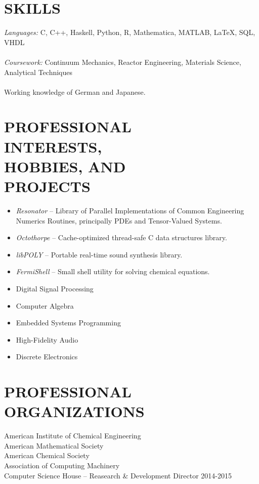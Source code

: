 \documentclass[line,margin]{res}
\begin{document}
\begin{resume}
\section{SKILLS} {\sl Languages:} C, C++, Haskell, Python, R, Mathematica, MATLAB, \LaTeX, SQL, VHDL \\ \\
                 {\sl Coursework:} Continuum Mechanics, Reactor Engineering, Materials Science, Analytical Techniques \\ \\
                 Working knowledge of German and Japanese.

\section{PROFESSIONAL \\ INTERESTS, \\ HOBBIES, AND \\ PROJECTS}
				\begin{itemize} \itemsep -2pt
				\item	\emph{Resonator} -- Library of Parallel Implementations of Common Engineering Numerics Routines, principally PDEs and Tensor-Valued Systems.
				\item	\emph{Octothorpe} -- Cache-optimized thread-safe C data structures library.
				\item	\emph{libPOLY} -- Portable real-time sound synthesis library.
				\item	\emph{FermiShell} -- Small shell utility for solving chemical equations.
				\item	Digital Signal Processing
				\item	Computer Algebra
				\item	Embedded Systems Programming
				\item	High-Fidelity Audio
				\item	Discrete Electronics
				\end{itemize}

\section{PROFESSIONAL ORGANIZATIONS}
American Institute of Chemical Engineering\\
American Mathematical Society\\
American Chemical Society\\
Association of Computing Machinery\\
Computer Science House -- Reasearch \& Development Director 2014-2015\\

\end{resume}
\end{document}
